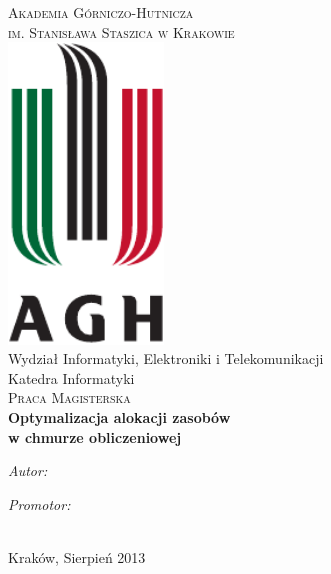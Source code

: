 \documentclass[11pt, a4paper]{Thesis} %
\begin{document}
\begin{titlepage}
\begin{center}

\textsc{\LARGE Akademia Górniczo-Hutnicza \\im. Stanisława Staszica w Krakowie}\\[1.5cm] %

\includegraphics[height=8cm]{Logo} %
\\[1.5cm]
Wydział Informatyki, Elektroniki i Telekomunikacji\\Katedra Informatyki\\[2cm] %


\textsc{\Large Praca Magisterska}\\[1.5cm] %


{\huge \bfseries Optymalizacja alokacji zasobów \\w chmurze obliczeniowej
}\\ [1.5cm] %
 
\begin{minipage}{0.4\textwidth}
\begin{flushleft} \large
\emph{Autor:}\\
\authornames %
\end{flushleft}
\end{minipage}
\begin{minipage}{0.4\textwidth}
\begin{flushright} \large
\emph{Promotor:} \\
\supname %
\end{flushright}
\end{minipage}\\[1.0cm]
 
{\large Kraków, Sierpień 2013}
 
\vfill
\end{center}

\end{titlepage}
\end{document}
